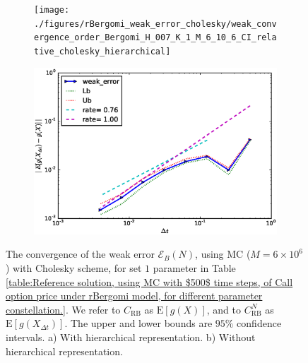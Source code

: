 \documentclass[11pt]{article}
\newcommand{\expt}[1]{\mathrm{E}\left[#1\right]}
\begin{document}
\FloatBarrier
\begin{figure}[h!]
	\centering
	\begin{subfigure}{.5\textwidth}
		\centering
		\texttt{[image: ./figures/rBergomi\_weak\_error\_cholesky/weak\_convergence\_order\_Bergomi\_H\_007\_K\_1\_M\_6\_10\_6\_CI\_relative\_cholesky\_hierarchical]}
		\caption{}
		\label{fig:sub3}
	\end{subfigure}%
	\begin{subfigure}{.5\textwidth}
		\centering
		\includegraphics[width=1\linewidth]{./figures/rBergomi_weak_error_cholesky/weak_convergence_order_Bergomi_H_007_K_1_M_4_10_6_CI_relative_cholesky_non_hierarchical_non_parallel_asymptotic}
		\caption{}
		\label{fig:sub4}
	\end{subfigure}
	
	\caption{The  convergence of the weak error $\mathcal{E}_B(N)$, using MC ($M=6 \times 10^6$) with Cholesky scheme, for set $1$ parameter in Table \ref{table:Reference solution, using MC with $500$ time steps, of Call option price under rBergomi model, for different parameter constellation.}. We refer to $C_{\text{RB}}$ as $\expt{g(X)}$, and to $C_{\text{RB}}^{N}$ as  $\expt{g(X_{\Delta t})}$. The upper and lower bounds are $95\%$ confidence intervals. a) With hierarchical representation.  b) Without hierarchical representation.}
	\label{fig:Weak_rate_set1_set_2_without_rich}
\end{figure}
\FloatBarrier


%		
\end{document}
